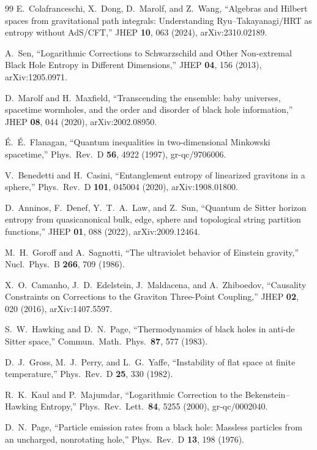 \documentclass[onecolumn,11pt,aps,prd,amsmath,amssymb,nofootinbib,floatfix]{revtex4-2}
\begin{document}
\begin{thebibliography}{99}
E.~Colafranceschi, X.~Dong, D.~Marolf, and Z.~Wang, ``Algebras and Hilbert spaces from gravitational path integrals: Understanding Ryu--Takayanagi/HRT as entropy without AdS/CFT,'' JHEP \textbf{10}, 063 (2024), arXiv:2310.02189.

A.~Sen, ``Logarithmic Corrections to Schwarzschild and Other Non-extremal Black Hole Entropy in Different Dimensions,'' JHEP \textbf{04}, 156 (2013), arXiv:1205.0971.

D.~Marolf and H.~Maxfield, ``Transcending the ensemble: baby universes, spacetime wormholes, and the order and disorder of black hole information,'' JHEP \textbf{08}, 044 (2020), arXiv:2002.08950.

\'E.~\'E.~Flanagan, ``Quantum inequalities in two-dimensional Minkowski spacetime,'' Phys.\ Rev.\ D \textbf{56}, 4922 (1997), gr-qc/9706006.

V.~Benedetti and H.~Casini, ``Entanglement entropy of linearized gravitons in a sphere,'' Phys.\ Rev.\ D \textbf{101}, 045004 (2020), arXiv:1908.01800.

D.~Anninos, F.~Denef, Y.~T.~A.~Law, and Z.~Sun, ``Quantum de Sitter horizon entropy from quasicanonical bulk, edge, sphere and topological string partition functions,'' JHEP \textbf{01}, 088 (2022), arXiv:2009.12464.

M.~H.~Goroff and A.~Sagnotti, ``The ultraviolet behavior of Einstein gravity,'' Nucl.\ Phys.\ B \textbf{266}, 709 (1986).

X.~O.~Camanho, J.~D.~Edelstein, J.~Maldacena, and A.~Zhiboedov, ``Causality Constraints on Corrections to the Graviton Three-Point Coupling,'' JHEP \textbf{02}, 020 (2016), arXiv:1407.5597.

S.~W.~Hawking and D.~N.~Page, ``Thermodynamics of black holes in anti-de Sitter space,'' Commun.\ Math.\ Phys.\ \textbf{87}, 577 (1983).

D.~J.~Gross, M.~J.~Perry, and L.~G.~Yaffe, ``Instability of flat space at finite temperature,'' Phys.\ Rev.\ D \textbf{25}, 330 (1982).

R.~K.~Kaul and P.~Majumdar, ``Logarithmic Correction to the Bekenstein--Hawking Entropy,'' Phys.\ Rev.\ Lett.\ \textbf{84}, 5255 (2000), gr-qc/0002040.

D.~N.~Page, ``Particle emission rates from a black hole: Massless particles from an uncharged, nonrotating hole,'' Phys.\ Rev.\ D \textbf{13}, 198 (1976).


\end{thebibliography}
\end{document}
